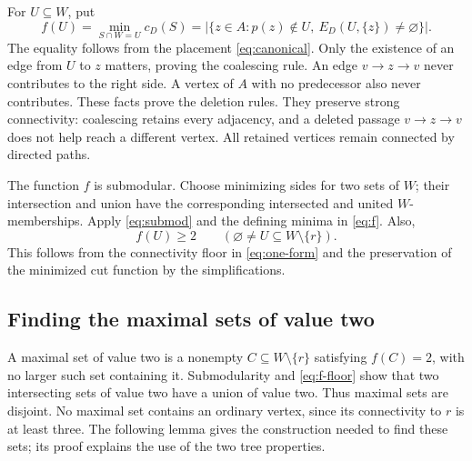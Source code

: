 \documentclass[11pt]{article}
\theoremstyle{definition}
\theoremstyle{remark}
\begin{document}
For \(U\subseteq W\), put
\begin{equation}
 f(U)=\min_{S\cap W=U}c_D(S)
     =|\{z\in A:p(z)\notin U,\ E_D(U,\{z\})\ne\varnothing\}|.
 \label{eq:f}
\end{equation}
The equality follows from the placement \eqref{eq:canonical}. Only the existence of an edge from \(U\) to \(z\) matters, proving the coalescing rule. An edge \(v\to z\to v\) never contributes to the right side. A vertex of \(A\) with no predecessor also never contributes. These facts prove the deletion rules. They preserve strong connectivity: coalescing retains every adjacency, and a deleted passage \(v\to z\to v\) does not help reach a different vertex. All retained vertices remain connected by directed paths.

The function \(f\) is submodular. Choose minimizing sides for two sets of \(W\); their intersection and union have the corresponding intersected and united \(W\)-memberships. Apply \eqref{eq:submod} and the defining minima in \eqref{eq:f}. Also,
\begin{equation}
 f(U)\ge2\qquad(\varnothing\ne U\subseteq W\setminus\{r\}).
 \label{eq:f-floor}
\end{equation}
This follows from the connectivity floor in \eqref{eq:one-form} and the preservation of the minimized cut function by the simplifications.

\subsection{Finding the maximal sets of value two}
\label{sec:find-two}
A maximal set of value two is a nonempty \(C\subseteq W\setminus\{r\}\) satisfying \(f(C)=2\), with no larger such set containing it. Submodularity and \eqref{eq:f-floor} show that two intersecting sets of value two have a union of value two. Thus maximal sets are disjoint. No maximal set contains an ordinary vertex, since its connectivity to \(r\) is at least three. The following lemma gives the construction needed to find these sets; its proof explains the use of the two tree properties.
\end{document}
